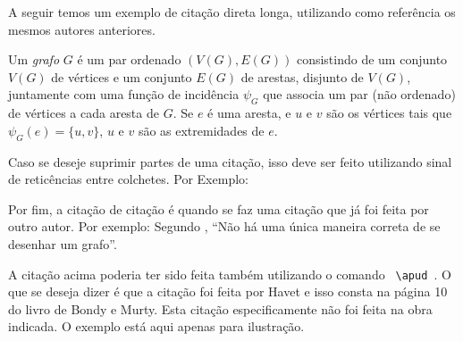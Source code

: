     A seguir temos um exemplo de citação direta longa, utilizando como referência os mesmos autores anteriores.
  
    \begin{citacao}
        Um \emph{grafo} $G$ é um par ordenado $(V(G),E(G))$ consistindo de um conjunto $V(G)$ de vértices e um conjunto $E(G)$ de arestas, disjunto de $V(G)$, juntamente com uma função de incidência $\psi_G$ que associa um par (não ordenado) de vértices a cada aresta de $G$. Se $e$ é uma aresta, e $u$ e $v$ são os vértices tais que $\psi_G(e) = \{u,v\}$, $u$ e $v$ são as extremidades de $e$. \cite[p.2]{BondyMurty}
    \end{citacao}

    Caso se deseje suprimir partes de uma citação, isso deve ser feito utilizando sinal de reticências entre colchetes. Por Exemplo:

    Por fim, a citação de citação é quando se faz uma citação que já foi feita por outro autor. Por exemplo: Segundo , ``Não há uma única maneira correta de se desenhar um grafo''.

    A citação acima poderia ter sido feita também utilizando o comando \verb| \apud |. O que se deseja dizer é que a citação foi feita por Havet e isso consta na página 10 do livro de Bondy e Murty. Esta citação especificamente não foi feita na obra indicada. O exemplo está aqui apenas para ilustração.